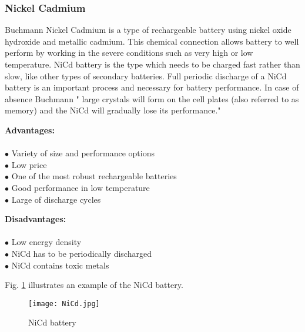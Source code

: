 \subsubsection{Nickel Cadmium \label{sec:tech}}
 Buchmann\cite{7} Nickel Cadmium is a type of rechargeable battery using nickel oxide hydroxide and metallic cadmium. This chemical connection allows battery to well perform by working in the severe conditions such as very high or low temperature. NiCd battery is the type which needs to be charged fast rather than slow, like other types of secondary batteries. Full periodic discharge of a NiCd battery is an important process and necessary for battery performance. In case of absence  Buchmann\cite{7} " large crystals will form on the cell plates (also referred to as memory) and the NiCd will gradually lose its performance."
 
 \newpage

\begin{multicols}{2}

	\textbf{Advantages:} \\ \\
	$\bullet$ Variety of size and performance options\\
	$\bullet$ Low price\\
	$\bullet$ One of the most robust rechargeable batteries\\
	$\bullet$ Good performance in low temperature\\
	$\bullet$ Large of discharge cycles\\
	
	
	\columnbreak
	
	\textbf{Disadvantages:} \\ \\
	$\bullet$ Low energy density\\
	$\bullet$ NiCd has to be periodically discharged\\
	$\bullet$ NiCd contains toxic metals\\ 


\end{multicols}

Fig. \ref{fig: nicd} illustrates an example of the NiCd battery. 



\begin{figure}[h]
	\centering
	\texttt{[image: NiCd.jpg]}
	\caption{NiCd battery\cite{9}}
	\label{fig: nicd}
\end{figure} 


